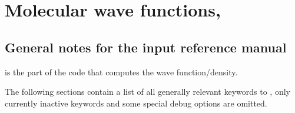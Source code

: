 
\def\mxfelt{20 } %


\chapter{\label{chap:sirius-inpref}Molecular wave functions, {\sir}}

\section{\label{sec:sirius-ref-notes} General notes for the {\sir} input reference
manual}

{\sir} is the part of the code that computes the wave function/density.

The following sections contain a list of all generally relevant keywords to
{\sir}, only currently inactive keywords and some special debug
options are omitted.

